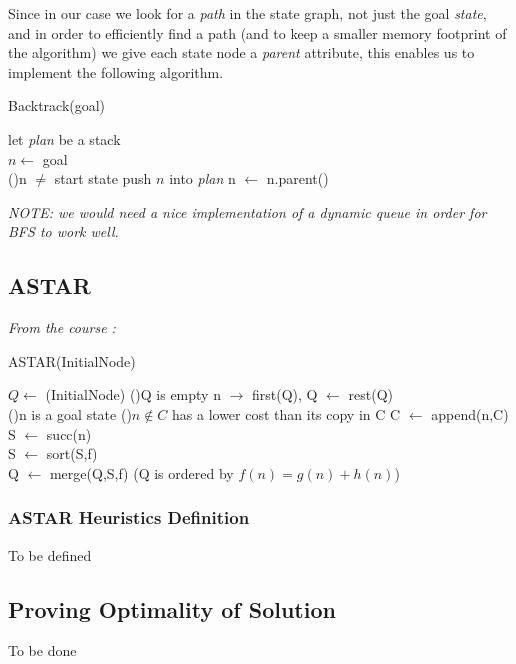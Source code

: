 \documentclass[11pt]{article}
\begin{document}
Since in our case we look for a \emph{path} in the state graph, not just the goal \emph{state}, and in order to efficiently find a path (and to keep a smaller memory footprint of the algorithm) we give each state node a \emph{parent} attribute, this enables us to implement the following algorithm. 

\begin{algorithm}[H]
    \caption{Backtrack(goal)}
    \SetAlgoLined
    let \emph{plan} be a stack \\
    $n \leftarrow$ goal\\
    \Repeat(){n $\neq$ start state}{
        push $n$ into \emph{plan}
        n $\leftarrow$ n.parent()
        }
\end{algorithm}
\emph{NOTE: we would need a nice implementation of a dynamic queue in order for BFS to work well.}

\subsection{ASTAR}

\emph{From the course : }

\begin{algorithm}[H]
    \caption{ASTAR(InitialNode)}
    \SetAlgoLined
    $Q \leftarrow$ (InitialNode)
    \Repeat(){Q is empty}{
        n $\rightarrow$ first(Q), Q $\leftarrow$ rest(Q) \\
        \If(){n is a goal state}{
        }
        \If(){$n \not \in C$ has a lower cost than its copy in C }{
            C $\leftarrow$ append(n,C)\\
            S $\leftarrow$ succ(n) \\
            S $\leftarrow$ sort(S,f) \\
            Q $\leftarrow$ merge(Q,S,f) (Q is ordered by $f(n) = g(n)+h(n)$)
        }
    }
\end{algorithm}

\subsubsection{ASTAR Heuristics Definition}
To be defined

\subsection{Proving Optimality of Solution}
To be done
\end{document}
